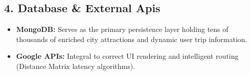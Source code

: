 \documentclass[12pt, a4paper]{article}
\begin{document}
\subsection*{4. Database \& External Apis}
\begin{itemize}
    \item \textbf{MongoDB:} Serves as the primary persistence layer holding tens of thousands of enriched city attractions and dynamic user trip information.
    \item \textbf{Google APIs:} Integral to correct UI rendering and intelligent routing (Distance Matrix latency algorithms).
\end{itemize}
\end{document}
